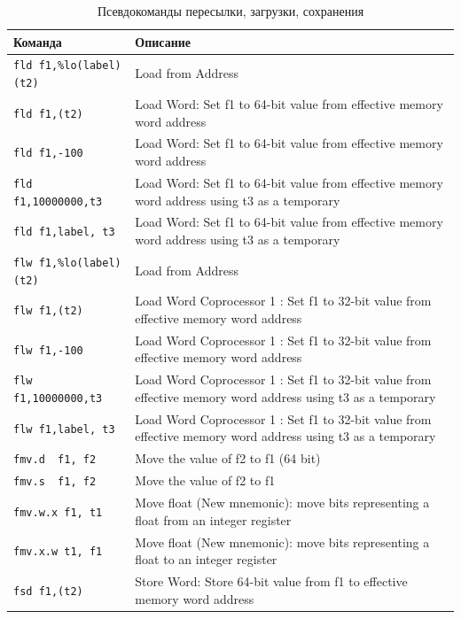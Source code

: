 \begin{table}[h]
    \caption{Псевдокоманды пересылки, загрузки, сохранения}
    \centering
    \begin{tabularx}{\textwidth}{|l|X|}
        \hline
        \textbf{Команда} & \textbf{Описание} \\
        \hline \texttt{fld f1,\%lo(label)(t2)} & Load from Address \\
        \hline \verb|fld f1,(t2)| & Load Word: Set f1 to 64-bit value from effective memory word address \\
        \hline \verb|fld f1,-100| & Load Word: Set f1 to 64-bit value from effective memory word address \\
        \hline \verb|fld f1,10000000,t3| & Load Word: Set f1 to 64-bit value from effective memory word address using t3 as a temporary \\
        \hline \verb|fld f1,label, t3| & Load Word: Set f1 to 64-bit value from effective memory word address using t3 as a temporary \\
        \hline \texttt{flw f1,\%lo(label)(t2)} & Load from Address \\
        \hline \verb|flw f1,(t2)| & Load Word Coprocessor 1 : Set f1 to 32-bit value from effective memory word address \\
        \hline \verb|flw f1,-100| & Load Word Coprocessor 1 : Set f1 to 32-bit value from effective memory word address \\
        \hline \verb|flw f1,10000000,t3| & Load Word Coprocessor 1 : Set f1 to 32-bit value from effective memory word address using t3 as a temporary \\
        \hline \verb|flw f1,label, t3| & Load Word Coprocessor 1 : Set f1 to 32-bit value from effective memory word address using t3 as a temporary \\
        \hline \verb|fmv.d  f1, f2| & Move the value of f2 to f1 (64 bit) \\
        \hline \verb|fmv.s  f1, f2| & Move the value of f2 to f1 \\
        \hline \verb|fmv.w.x f1, t1| & Move float (New mnemonic): move bits representing a float from an integer register \\
        \hline \verb|fmv.x.w t1, f1| & Move float (New mnemonic): move bits representing a float to an integer register \\
        \hline \verb|fsd f1,(t2)| & Store Word: Store 64-bit value from f1 to effective memory word address \\

\end{tabularx}
\end{table}
